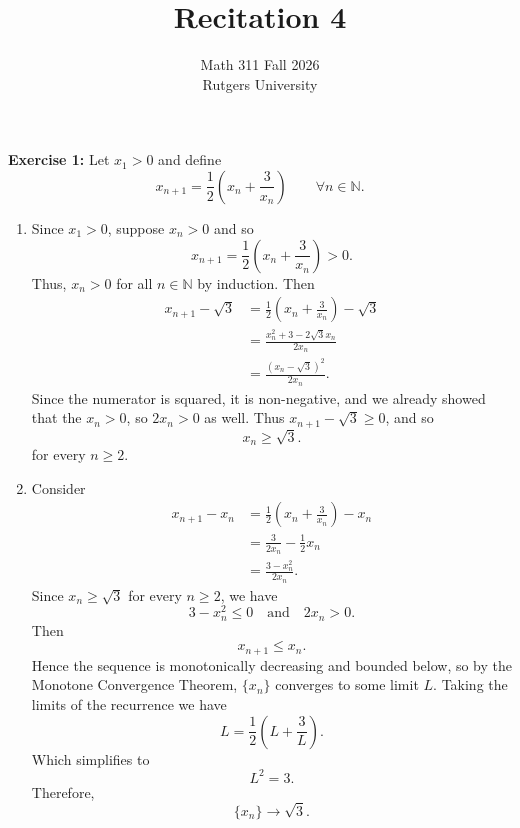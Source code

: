 \documentclass[12pt]{article}
\title{Recitation 4}
\author{Math 311 Fall 2026 \\ Rutgers University}
\date{}
\begin{document}
\maketitle

\textbf{Exercise 1:}
Let \(x_1 > 0\) and define
\[
    x_{n+1} = \frac{1}{2}(x_n + \frac{3}{x_n}) \qquad \forall n \in \mathbb{N}.
\]
\begin{enumerate}[label=(\alph*)]
    \item
          Since \(x_1 > 0\), suppose \(x_n > 0\) and so
          \[
              x_{n+1} = \frac{1}{2}(x_n + \frac{3}{x_n}) > 0.
          \]
          Thus, $x_n > 0$ for all \(n \in \mathbb{N}\) by induction.
          Then
          \[
              \begin{split}
                  x_{n+1} - \sqrt{3} & = \frac{1}{2}\left(x_n + \frac{3}{x_n}\right)- \sqrt{3} \\
                                     & = \frac{x_n^2 + 3 - 2\sqrt{3}x_n}{2x_n}                 \\
                                     & = \frac{\left(x_n - \sqrt{3}\right)^2}{2x_n}.
              \end{split}
          \]
          Since the numerator is squared, it is non-negative,
          and we already showed that the \(x_n > 0\), so \(2x_n > 0\) as well.
          Thus \(x_{n+1} - \sqrt{3} \geq  0 \), and so
          \[
              x_{n} \geq \sqrt{3}.
          \]
          for every \(n \geq 2\).
    \item Consider
          \[
              \begin{split}
                  x_{n+1} - x_n & = \frac{1}{2}\left(x_n + \frac{3}{x_n}\right) - x_n \\
                                & = \frac{3}{2x_n} - \frac{1}{2} x_n                  \\
                                & = \frac{3-x_n^2}{2x_n}.
              \end{split}
          \]
          Since $x_n \geq \sqrt{3}$ for every \(n \geq 2\), we have
          \[
              3-x_n^2 \leq 0 \quad \text{and} \quad 2x_n > 0.
          \]
          Then
          \[
              x_{n+1} \leq x_n.
          \]
          Hence the sequence is monotonically decreasing and bounded below, so by the Monotone Convergence Theorem,
          \(\{x_n\}\) converges to some limit \(L\). Taking the limits of the recurrence we have
          \[
              L = \frac{1}{2}\left(L + \frac{3}{L}\right).
          \]
          Which simplifies to
          \[
              L^2 = 3.
          \]
          Therefore,
          \[
              \{x_n\} \to \sqrt{3}.
          \]












\end{enumerate}
\end{document}
